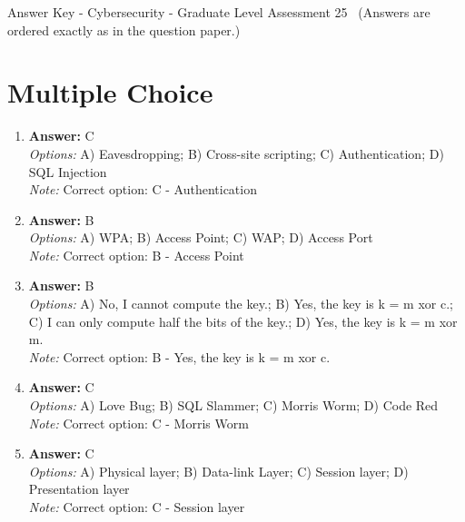 \documentclass[12pt]{article}
\begin{document}
\begin{center}
Answer Key - Cybersecurity - Graduate Level Assessment 25 \
\small (Answers are ordered exactly as in the question paper.)
\end{center}

\section*{Multiple Choice}
\begin{enumerate}[label=\arabic*.]
\item \textbf{Answer:} C
\\ \textit{Options:} A) Eavesdropping; B) Cross-site scripting; C) Authentication; D) SQL Injection
\\ \textit{Note:} Correct option: C - Authentication
\item \textbf{Answer:} B
\\ \textit{Options:} A) WPA; B) Access Point; C) WAP; D) Access Port
\\ \textit{Note:} Correct option: B - Access Point
\item \textbf{Answer:} B
\\ \textit{Options:} A) No, I cannot compute the key.; B) Yes, the key is k = m xor c.; C) I can only compute half the bits of the key.; D) Yes, the key is k = m xor m.
\\ \textit{Note:} Correct option: B - Yes, the key is k = m xor c.
\item \textbf{Answer:} C
\\ \textit{Options:} A) Love Bug; B) SQL Slammer; C) Morris Worm; D) Code Red
\\ \textit{Note:} Correct option: C - Morris Worm
\item \textbf{Answer:} C
\\ \textit{Options:} A) Physical layer; B) Data-link Layer; C) Session layer; D) Presentation layer
\\ \textit{Note:} Correct option: C - Session layer
\end{enumerate}
\end{document}
